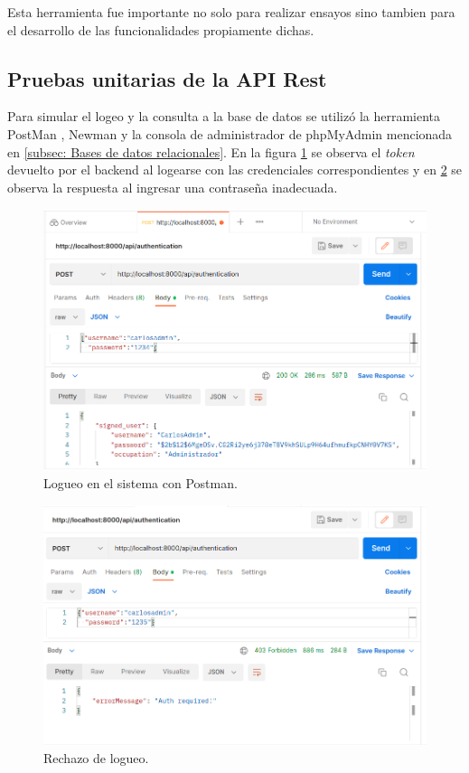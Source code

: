 Esta herramienta fue importante no solo para realizar ensayos sino tambien para el desarrollo de las funcionalidades propiamente dichas.



\subsection{Pruebas unitarias de la API Rest}

Para simular el logeo y la consulta a la base de datos se utilizó la herramienta PostMan \citep{WEBSITE:30}, Newman \citep{WEBSITE:35} y la consola de administrador de phpMyAdmin mencionada en \ref{subsec: Bases de datos relacionales}. En la figura \ref{fig:Logueo en el sistema con Postman} se observa el \textit{token} devuelto por el backend al logearse con las credenciales correspondientes y en \ref{fig:Rechazo Logueo en el sistema con Postman} se observa la respuesta al ingresar una contraseña inadecuada.

\begin{figure}[ht]
	\centering
	\includegraphics[scale=.35]{./Figures/auth.png}
	\caption{Logueo en el sistema con Postman.}
	\label{fig:Logueo en el sistema con Postman}
\end{figure}

\begin{figure}[ht]
	\centering
	\includegraphics[scale=.35]{./Figures/no-auth.png}
	\caption{Rechazo de logueo.}
	\label{fig:Rechazo Logueo en el sistema con Postman}
\end{figure}

